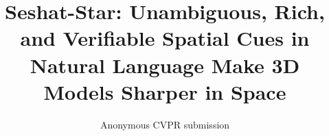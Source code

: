 \documentclass[10pt,twocolumn,letterpaper]{article}
\title{Seshat-Star: Unambiguous, Rich, and Verifiable Spatial Cues in Natural Language Make 3D Models Sharper in Space}
\author{Anonymous CVPR submission}
\begin{document}
\maketitle









\clearpage   %
{
    \small
    
    
}

\ifwithsupp

\fi
\end{document}
